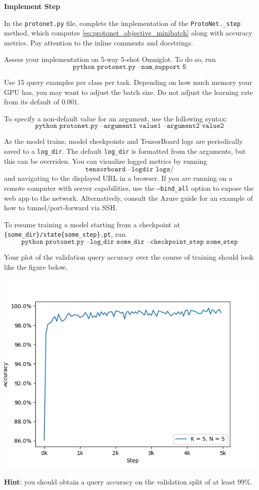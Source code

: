 \item {} {\bf Implement Step}

In the \texttt{protonet.py} file, complete the implementation of the \texttt{ProtoNet.\_step} method, which computes \eqref{eq:protonet_objective_minibatch} along with accuracy metrics. Pay attention to the inline comments and docstrings.
    
Assess your implementation on 5-way 5-shot Omniglot. To do so, run 
\begin{equation*} 
    \texttt{python protonet.py --num\_support 5} 
\end{equation*}

Use 15 query examples per class per task. Depending on how much memory your GPU has, you may want to adjust the batch size. Do not adjust the learning rate from its default of $0.001$.

To specify a non-default value for an argument, use the following syntax:
\begin{equation*}
    \texttt{python protonet.py --argument1 value1 --argument2 value2}
\end{equation*}

    As the model trains, model checkpoints and TensorBoard logs are periodically saved to a \texttt{log\_dir}. The default \texttt{log\_dir} is formatted from the arguments, but this can be overriden. You can visualize logged metrics by running
\begin{equation*}
    \texttt{tensorboard --logdir logs/}
\end{equation*}
and navigating to the displayed URL in a browser. If you are running on a remote computer with server capabilities, use the \texttt{--bind\_all} option to expose the web app to the network. Alternatively, consult the Azure guide for an example of how to tunnel/port-forward via SSH.

To resume training a model starting from a checkpoint at \texttt{\{some\_dir\}/state\{some\_step\}.pt}, run
\begin{equation*}
    \texttt{python protonet.py --log\_dir some\_dir --checkpoint\_step some\_step}
\end{equation*}

Your plot of the validation query accuracy over the course of training should look like the figure below.
\begin{center}
    \includegraphics[width=0.75\linewidth]{./figures/protonets_q2}
\end{center}

\textbf{Hint}: you should obtain a query accuracy on the validation split of at least $99\%$.